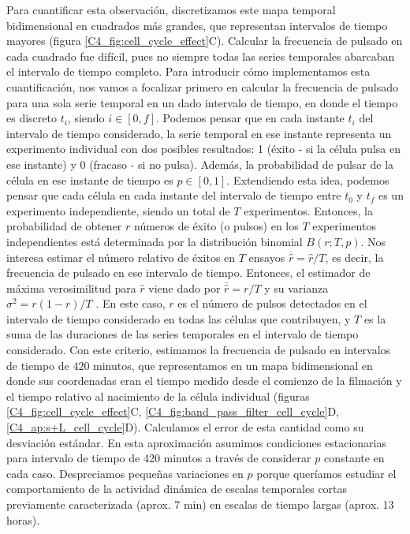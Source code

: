 \documentclass[./main.tex]{subfiles}
\begin{document}
Para cuantificar esta observación, discretizamos este mapa temporal bidimensional en cuadrados más grandes, que representan intervalos de tiempo mayores (figura \ref{C4_fig:cell_cycle_effect}C). Calcular la frecuencia de pulsado en cada cuadrado fue difícil, pues no siempre todas las series temporales abarcaban el intervalo de tiempo completo. Para introducir cómo implementamos esta cuantificación, nos vamos a focalizar primero en calcular la frecuencia de pulsado para una sola serie temporal en un dado intervalo de tiempo, en donde el tiempo es discreto $t_i$, siendo $i \in [0,f]$. Podemos pensar que en cada instante $t_i$ del intervalo de tiempo considerado, la serie temporal en ese instante representa un experimento individual con dos posibles resultados: 1 (éxito - si la célula pulsa en ese instante) y 0 (fracaso - si no pulsa). Además, la probabilidad de pulsar de la célula en ese instante de tiempo es $p \in [0,1]$. Extendiendo esta idea, podemos pensar que cada célula en cada instante del intervalo de tiempo entre $t_0$ y $t_f$ es un experimento independiente, siendo un total de $T$  experimentos. Entonces, la probabilidad de obtener $r$ números de éxito (o pulsos) en los $T$ experimentos independientes está determinada por la distribución binomial $B(r;T,p)$. Nos interesa estimar el número relativo de éxitos en $T$ ensayos $\overline{\hat{r}}= \hat{r}/T$, es decir, la frecuencia de pulsado en ese intervalo de tiempo. Entonces, el estimador de máxima verosimilitud para $\hat{r}$ viene dado por $\overline{\hat{r}}= r/T$ y su varianza $\sigma^2 =  r (1-r)/T$ \cite{Frodesen1979}. En este caso, $r$ es el número de pulsos detectados en el intervalo de tiempo considerado en todas las células que contribuyen, y $T$ es la suma de las duraciones de las series temporales en el intervalo de tiempo considerado. Con este criterio, estimamos la frecuencia de pulsado en intervalos de 
tiempo de $420$ minutos, que representamos en un mapa bidimensional en donde sus coordenadas eran el tiempo medido desde el comienzo de la filmación y el tiempo relativo al nacimiento de la célula individual (figuras \ref{C4_fig:cell_cycle_effect}C, \ref{C4_fig:band_pass_filter_cell_cycle}D,\ref{C4_ap:s+L_cell_cycle}D). Calculamos el error de esta cantidad como su desviación estándar. En esta aproximación asumimos condiciones estacionarias para intervalo de tiempo de 420 minutos a través de considerar $p$ constante en cada caso. Despreciamos pequeñas variaciones en $p$ porque queríamos estudiar el comportamiento de la actividad dinámica de escalas temporales cortas previamente caracterizada (aprox. 7 min) en escalas de tiempo largas (aprox. 13 horas). 
\end{document}
